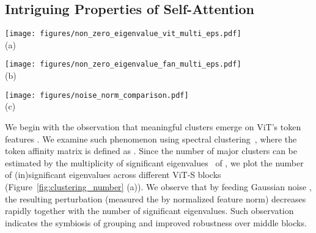 \documentclass[nohyperref]{article}
\theoremstyle{plain}
\theoremstyle{definition}
\theoremstyle{remark}
\begin{document}
\subsection{Intriguing Properties of Self-Attention}\label{subsec:sa_property}

\begin{figure*}[t] 
	\small
	\centering
	\begin{minipage}{0.328\linewidth}
		\centering
		\texttt{[image: figures/non\_zero\_eigenvalue\_vit\_multi\_eps.pdf]}\\ \vspace{-2mm}
		(a)
	\end{minipage}\hfill
	\begin{minipage}{0.328\linewidth}
		\centering
		\texttt{[image: figures/non\_zero\_eigenvalue\_fan\_multi\_eps.pdf]}\\ \vspace{-2mm}
		(b)
	\end{minipage}\hfill
	\begin{minipage}{0.302\linewidth}
		\centering
		\texttt{[image: figures/noise\_norm\_comparison.pdf]}\\ \vspace{-2mm}
		(c)
	\end{minipage}
	\vspace{-3mm}
	\caption{\textbf{Analysis on the grouping of tokens and noise decay.} (a) and (b) shows the \# of insignificant (zero) eigenvalues and the noise input decay of ViT-S and FAN-S respectively; (c) shows the comparison of noise norm across different blocks in FAN-S, ViT-S and ResNet-50. Plots shown in (a) and (b) show that the number of zero eigenvalues increases as the model goes deeper, which indicates the emerging grouping of tokens. Given the input Gaussian noise, its magnitude similarly decays over more self-attention blocks. Such a phenomenon is not observed in the ResNet-50 model.
	}
	\label{fig:clustering_number}
\end{figure*}

We begin with the observation that meaningful clusters emerge on ViT's token features . We examine such phenomenon using spectral clustering~\cite{ng2002spectral}, where the token affinity matrix is defined as . Since the number of major clusters can be estimated by the multiplicity of significant eigenvalues~\cite{manor2004self} of , we plot the number of (in)significant eigenvalues across different ViT-S blocks (Figure~\ref{fig:clustering_number} (a)). We observe that by feeding Gaussian noise , the resulting perturbation (measured the by normalized feature norm) decreases rapidly together with the number of significant eigenvalues. Such observation indicates the symbiosis of grouping and improved robustness over middle blocks. 
\end{document}
